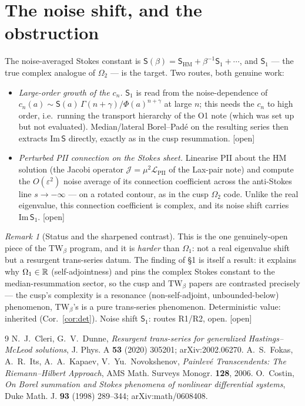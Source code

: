 \documentclass[11pt,reqno]{amsart}
\theoremstyle{plain}\newtheorem{proposition}{Proposition}\newtheorem{corollary}[proposition]{Corollary}
\theoremstyle{remark}\newtheorem{remark}[proposition]{Remark}
\newcommand{\eps}{\varepsilon}
\newcommand{\gap}{{\footnotesize\textsf{[open]}}}
\begin{document}
\section{The noise shift, and the obstruction}

The noise-averaged Stokes constant is $\mathsf S(\beta)=\mathsf S_{\mathrm{HM}}+\beta^{-1}\mathsf S_1+\cdots$,
and $\mathsf S_1$ --- the true complex analogue of $\Omega_2$ --- is the target. Two routes, both
genuine work:
\begin{itemize}
\item[(R1)] \emph{Large-order growth of the $c_n$.} $\mathsf S_1$ is read from the noise-dependence
of $c_n(a)\sim \mathsf S(a)\,\Gamma(n+\gamma)/\Phi(a)^{n+\gamma}$ at large $n$; this needs the $c_n$
to high order, i.e.\ running the transport hierarchy of the O1 note (which was set up but not
evaluated). Median/lateral Borel--Pad\'e on the resulting series then extracts
$\mathrm{Im}\,\mathsf S$ directly, exactly as in the cusp resummation. \gap
\item[(R2)] \emph{Perturbed PII connection on the Stokes sheet.} Linearise PII about the HM
solution (the Jacobi operator $\mathcal J=\mu^2\mathcal L_{\mathrm{PII}}$ of the Lax-pair note) and
compute the $O(\eps^2)$ noise average of its connection coefficient across the anti-Stokes line
$s\to-\infty$ --- on a rotated contour, as in the cusp $\Omega_2$ code. Unlike the real
eigenvalue, this connection coefficient is complex, and its noise shift carries
$\mathrm{Im}\,\mathsf S_1$. \gap
\end{itemize}

\begin{remark}[Status and the sharpened contrast]\label{rem:status}
This is the one genuinely-open piece of the $\mathrm{TW}_\beta$ program, and it is
\emph{harder} than $\Omega_1$: not a real eigenvalue shift but a resurgent trans-series datum. The
finding of \S1 is itself a result: it explains why $\Omega_1\in\mathbb{R}$ (self-adjointness) and pins the
complex Stokes constant to the median-resummation sector, so the cusp and $\mathrm{TW}_\beta$
papers are contrasted precisely --- the cusp's complexity is a resonance (non-self-adjoint,
unbounded-below) phenomenon, $\mathrm{TW}_\beta$'s is a pure trans-series phenomenon. Deterministic
value: inherited (Cor.~\ref{cor:det}). Noise shift $\mathsf S_1$: routes R1/R2, open. \gap
\end{remark}

\begin{thebibliography}{9}
 N.~J.~Cleri, G.~V.~Dunne, \emph{Resurgent trans-series for generalized
Hastings--McLeod solutions}, J. Phys. A \textbf{53} (2020) 305201; arXiv:2002.06270.
 A.~S.~Fokas, A.~R.~Its, A.~A.~Kapaev, V.~Yu.~Novokshenov, \emph{Painlev\'e
Transcendents: The Riemann--Hilbert Approach}, AMS Math. Surveys Monogr. \textbf{128}, 2006.
 O.~Costin, \emph{On Borel summation and Stokes phenomena of nonlinear differential
systems}, Duke Math. J. \textbf{93} (1998) 289--344; arXiv:math/0608408.
\end{thebibliography}
\end{document}
